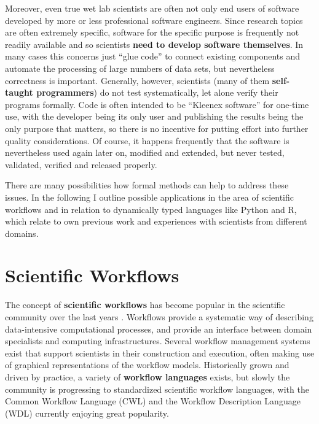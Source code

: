 \documentclass[sigplan,10pt,noacm]{acmart}
\begin{document}
Moreover, even true wet lab scientists are often not only end users of software developed by more or less professional software engineers. Since research topics are often extremely specific, software for the specific purpose is frequently not readily available and so scientists \textbf{need to develop software themselves}. In many cases this concerns just \enquote{glue code} to connect existing components and automate the processing of large numbers of data sets, but nevertheless correctness is important. Generally, however, scientists (many of them \textbf{self-taught programmers}) do not test systematically, let alone verify their programs formally. Code is often intended to be \enquote{Kleenex software} for one-time use, with the developer being its only user and publishing the results being the only purpose that matters, so there is no incentive for putting effort into further quality considerations. Of course, it happens frequently that the software is nevertheless used again later on, modified and extended, but never tested, validated, verified and released properly.

There are many possibilities how formal methods can help to address these issues. In the following I outline possible applications in the area of scientific workflows and in relation to dynamically typed languages like Python and R, which relate to own previous work and experiences with scientists from different domains. 

\section{Scientific Workflows}

The concept of \textbf{scientific workflows} has become popular in the scientific community over the last years \cite{AtGeMT2017}. Workflows provide a systematic way of describing data-intensive computational processes, and provide an interface between domain specialists and computing infrastructures. 
Several workflow management systems exist that support scientists in their construction and execution, often making use of graphical representations of the workflow models. Historically grown and driven by practice, a variety of \textbf{workflow languages} exists, but slowly the community is progressing to standardized scientific workflow languages, with the Common Workflow Language (CWL) and the Workflow Description Language (WDL) currently enjoying great popularity. 
\end{document}
